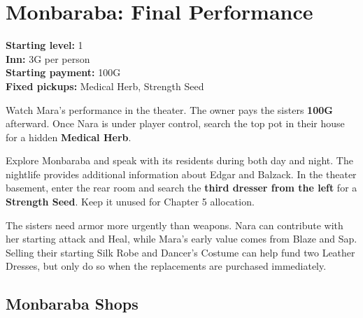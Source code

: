 \documentclass[
  american,
  10pt,
  letterpaper,
  oneside,
  open=any]{scrreprt}
\begin{document}
\section{Monbaraba: Final
Performance}\label{monbaraba-final-performance}

\textbf{Starting level:} 1\\
\textbf{Inn:} 3G per person\\
\textbf{Starting payment:} 100G\\
\textbf{Fixed pickups:} Medical Herb, Strength Seed

Watch Mara's performance in the theater. The owner pays the sisters
\textbf{100G} afterward. Once Nara is under player control, search the
top pot in their house for a hidden \textbf{Medical Herb}.

Explore Monbaraba and speak with its residents during both day and
night. The nightlife provides additional information about Edgar and
Balzack. In the theater basement, enter the rear room and search the
\textbf{third dresser from the left} for a \textbf{Strength Seed}. Keep
it unused for Chapter 5 allocation.

The sisters need armor more urgently than weapons. Nara can contribute
with her starting attack and Heal, while Mara's early value comes from
Blaze and Sap. Selling their starting Silk Robe and Dancer's Costume can
help fund two Leather Dresses, but only do so when the replacements are
purchased immediately.

\subsection{Monbaraba Shops}\label{monbaraba-shops}
\end{document}
